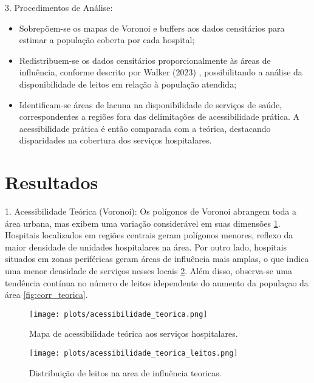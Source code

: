 \documentclass[
  8pt,
]{article}
\begin{document}
\begin{multicols}{2}
3. Procedimentos de Análise:

\begin{itemize}
    \item Sobrepõem-se os mapas de Voronoi e buffers aos dados censitários para estimar a população coberta por cada hospital;
    \item Redistribuem-se os dados censitários proporcionalmente às áreas de influência, conforme descrito por Walker (2023) , possibilitando a análise da disponibilidade de leitos em relação à população atendida;
    \item Identificam-se áreas de lacuna na disponibilidade de serviços de saúde, correspondentes a regiões fora das delimitações de acessibilidade prática. A acessibilidade prática é então comparada com a teórica, destacando disparidades na cobertura dos serviços hospitalares.
\end{itemize}

\section{Resultados}

1. Acessibilidade Teórica (Voronoi): Os polígonos de Voronoi abrangem toda a área urbana, mas exibem uma variação considerável em suas dimensões \cref{fig:acessibilidade_teorica}. Hospitais localizados em regiões centrais geram polígonos menores, reflexo da maior densidade de unidades hospitalares na área. Por outro lado, hospitais situados em zonas periféricas geram áreas de influência mais amplas, o que indica uma menor densidade de serviços nesses locais \cref{fig:acessibilidade_teorica_leitos}. Além disso, observa-se uma tendência contínua no número de leitos idependente do aumento da populaçao da área \cref{fig:corr_teorica}.

\begin{figure}[H]
    \centering
    \texttt{[image: plots/acessibilidade\_teorica.png]}
    \caption{Mapa de acessibilidade teórica aos serviços hospitalares.}
    \label{fig:acessibilidade_teorica}
\end{figure}

\begin{figure}[H]
    \centering
    \texttt{[image: plots/acessibilidade\_teorica\_leitos.png]}
    \caption{Distribuição de leitos na area de influência teoricas.}
    \label{fig:acessibilidade_teorica_leitos}
\end{figure}


\end{multicols}
\end{document}
